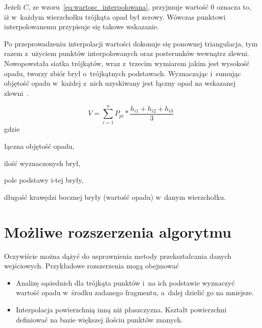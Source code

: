 Jeżeli $C$, ze wzoru~\ref{eq:wartosc_interpolowana}, przyjmuje wartość 0 oznacza to, iż w~każdym wierzchołku trójkąta opad był zerowy. Wówczas punktowi interpolowanemu przypisuje się takowe wskazanie.

Po przeprowadzeniu interpolacji wartości dokonuje się ponownej triangulacja, tym razem z~użyciem punktów interpolowanych oraz posterunków wewnątrz zlewni. Nowopowstała siatka trójkątów, wraz z~trzecim wymiarem jakim jest wysokość opadu, tworzy zbiór brył o~trójkątnych podstawach. Wyznaczając i~sumując objętość opadu w~każdej z~nich uzyskiwany jest łączny opad na wskazanej zlewni~\cite{matematyka_poradnik, mathMonthly}.

\begin{equation}
\label{eq:opad_powierzchniowy}
	V = \sum_{i=1}^{n}P_{pi}*\frac{h_{i1}+h_{i2}+h_{i3}}{3}
\end{equation}
gdzie
\begin{description}[leftmargin=3cm, itemsep=0cm, labelsep=0cm]
	\item[$V$] łączna objętość opadu,
	\item[$n$] ilość wyznaczonych brył,
	\item[$P_{pi}$] pole podstawy i-tej bryły,
	\item[$h_{i1}, h_{i2}, h_{i3}$] długość krawędzi bocznej bryły (wartość opadu) w~danym wierzchołku.
\end{description}




\section{Możliwe rozszerzenia algorytmu}
Oczywiście można dążyć do usprawnienia metody przekształcania danych wejściowych.
Przykładowe rozszerzenia mogą obejmować
\begin{itemize}
\item{ Analizę sąsiednich dla trójkąta punktów i~na ich podstawie wyznaczyć wartość opadu w~środku zadanego fragmentu, a~dalej dzielić go na mniejsze. }
\item{ Interpolacja powierzchnią inną niż płaszczyzna. Kształt powierzchni definiować na bazie większej ilościu punktów znanych. }
\end{itemize}